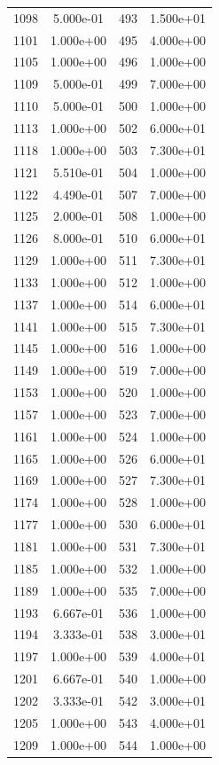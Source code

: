 \documentclass[12pt]{article}
\begin{document}
\begin{longtable}{@{}cccc@{}}
1098 & 5.000e-01 & 493 & 1.500e+01 \\
1101 & 1.000e+00 & 495 & 4.000e+00 \\
1105 & 1.000e+00 & 496 & 1.000e+00 \\
1109 & 5.000e-01 & 499 & 7.000e+00 \\
1110 & 5.000e-01 & 500 & 1.000e+00 \\
1113 & 1.000e+00 & 502 & 6.000e+01 \\
1118 & 1.000e+00 & 503 & 7.300e+01 \\
1121 & 5.510e-01 & 504 & 1.000e+00 \\
1122 & 4.490e-01 & 507 & 7.000e+00 \\
1125 & 2.000e-01 & 508 & 1.000e+00 \\
1126 & 8.000e-01 & 510 & 6.000e+01 \\
1129 & 1.000e+00 & 511 & 7.300e+01 \\
1133 & 1.000e+00 & 512 & 1.000e+00 \\
1137 & 1.000e+00 & 514 & 6.000e+01 \\
1141 & 1.000e+00 & 515 & 7.300e+01 \\
1145 & 1.000e+00 & 516 & 1.000e+00 \\
1149 & 1.000e+00 & 519 & 7.000e+00 \\
1153 & 1.000e+00 & 520 & 1.000e+00 \\
1157 & 1.000e+00 & 523 & 7.000e+00 \\
1161 & 1.000e+00 & 524 & 1.000e+00 \\
1165 & 1.000e+00 & 526 & 6.000e+01 \\
1169 & 1.000e+00 & 527 & 7.300e+01 \\
1174 & 1.000e+00 & 528 & 1.000e+00 \\
1177 & 1.000e+00 & 530 & 6.000e+01 \\
1181 & 1.000e+00 & 531 & 7.300e+01 \\
1185 & 1.000e+00 & 532 & 1.000e+00 \\
1189 & 1.000e+00 & 535 & 7.000e+00 \\
1193 & 6.667e-01 & 536 & 1.000e+00 \\
1194 & 3.333e-01 & 538 & 3.000e+01 \\
1197 & 1.000e+00 & 539 & 4.000e+01 \\
1201 & 6.667e-01 & 540 & 1.000e+00 \\
1202 & 3.333e-01 & 542 & 3.000e+01 \\
1205 & 1.000e+00 & 543 & 4.000e+01 \\
1209 & 1.000e+00 & 544 & 1.000e+00 \\

\end{longtable}
\end{document}
